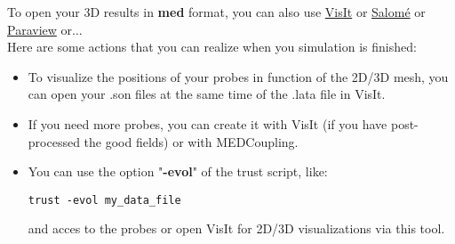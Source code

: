 To open your 3D results in \textbf{med} format, you can also use \href{https://wci.llnl.gov/simulation/computer-codes/visit}{VisIt} or \href{http://www.salome-platform.org}{Salom\'e} or \href{http://www.paraview.org}{Paraview} or...\\

Here are some actions that you can realize when you simulation is finished:
\begin{itemize}
\item To visualize the positions of your probes in function of the 2D/3D mesh, you can open your .son files at the same time of the .lata file in VisIt.
\item If you need more probes, you can create it with VisIt (if you have post-processed the good fields) or with MEDCoupling.
\item You can use the option "\textbf{-evol}" of the trust script, like:
\begin{verbatim}
trust -evol my_data_file
\end{verbatim}
and acces to the probes or open VisIt for 2D/3D visualizations via this tool.
\end{itemize}



